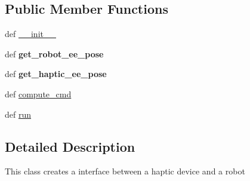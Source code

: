 \subsection*{Public Member Functions}
\begin{DoxyCompactItemize}
\item 
def \hyperlink{classaml__teleop_1_1haptic__teleop_1_1os__teleop__ctrl_1_1_o_s_teleop_ctrl_ac322577a0ecec88bc07491dfa707d298}{\-\_\-\-\_\-init\-\_\-\-\_\-}
\item 
\hypertarget{classaml__teleop_1_1haptic__teleop_1_1os__teleop__ctrl_1_1_o_s_teleop_ctrl_a824a88fa5bf603a3a55d27287f8ba47b}{def {\bfseries get\-\_\-robot\-\_\-ee\-\_\-pose}}\label{classaml__teleop_1_1haptic__teleop_1_1os__teleop__ctrl_1_1_o_s_teleop_ctrl_a824a88fa5bf603a3a55d27287f8ba47b}

\item 
\hypertarget{classaml__teleop_1_1haptic__teleop_1_1os__teleop__ctrl_1_1_o_s_teleop_ctrl_a34a4e125ee28d99493303f247a537551}{def {\bfseries get\-\_\-haptic\-\_\-ee\-\_\-pose}}\label{classaml__teleop_1_1haptic__teleop_1_1os__teleop__ctrl_1_1_o_s_teleop_ctrl_a34a4e125ee28d99493303f247a537551}

\item 
def \hyperlink{classaml__teleop_1_1haptic__teleop_1_1os__teleop__ctrl_1_1_o_s_teleop_ctrl_adf810d31dd841f92bf556da438834e7a}{compute\-\_\-cmd}
\item 
def \hyperlink{classaml__teleop_1_1haptic__teleop_1_1os__teleop__ctrl_1_1_o_s_teleop_ctrl_a70a3fbafa45a00bf37ae07761ff063e0}{run}
\end{DoxyCompactItemize}


\subsection{Detailed Description}
\begin{DoxyVerb}This class creates a interface between a haptic device and a robot\end{DoxyVerb}
 

